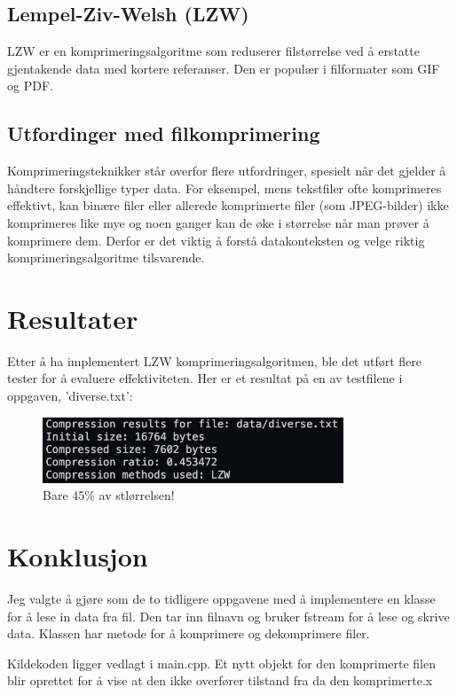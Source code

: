 \documentclass[12pt,a4paper]{article}
\begin{document}
\subsection{Lempel-Ziv-Welsh (LZW)}
LZW er en komprimeringsalgoritme som reduserer filstørrelse ved å erstatte gjentakende data med kortere referanser. Den er populær i filformater som GIF og PDF.

\subsection{Utfordinger med filkomprimering}
Komprimeringsteknikker står overfor flere utfordringer, spesielt når det gjelder å håndtere forskjellige typer data. For eksempel, mens tekstfiler ofte komprimeres effektivt, kan binære filer eller allerede komprimerte filer (som JPEG-bilder) ikke komprimeres like mye og noen ganger kan de øke i størrelse når man prøver å komprimere dem. Derfor er det viktig å forstå datakonteksten og velge riktig komprimeringsalgoritme tilsvarende.

\section{Resultater}
Etter å ha implementert LZW komprimeringsalgoritmen, ble det utført flere tester for å evaluere effektiviteten. Her er et resultat på en av testfilene i oppgaven, 'diverse.txt':
\begin{figure}[h]
    \centering
    \includegraphics[width=0.8\textwidth]{resultat.png}
    \caption{Bare 45\% av stlørrelsen!}
\end{figure}

\section{Konklusjon}
Jeg valgte å gjøre som de to tidligere oppgavene med å implementere en klasse for å lese in data fra fil. Den tar inn filnavn og bruker fstream for å lese og skrive data. Klassen har metode for å komprimere og dekomprimere filer.

Kildekoden ligger vedlagt i main.cpp. Et nytt objekt for den komprimerte filen blir oprettet for å vise at den ikke overfører tilstand fra da den komprimerte.x
\end{document}
